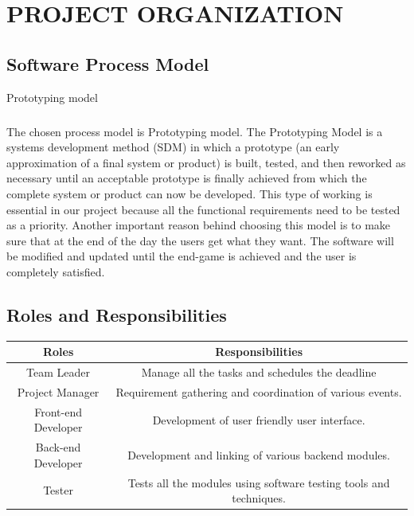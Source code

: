 \documentclass[12pt,a4paper,final,oneside]{report}
\begin{document}
\chapter{PROJECT ORGANIZATION}

\section{ Software Process Model}
{Prototyping model}

\paragraph{}The chosen process model is Prototyping model. The Prototyping Model is a systems development method (SDM) in which a prototype (an early approximation of a final system or product) is built, tested, and then reworked as necessary until an acceptable prototype is finally achieved from which the complete system or product can now be developed. This type of working is essential in our project because all the functional requirements need to be tested as a priority. Another important reason behind choosing this model is to make sure that at the end of the day the users get what they want. The software will be modified and updated until the end-game is achieved and the user is completely satisfied.

\section{ Roles and Responsibilities}
\begin{center}
    \begin{tabular}{ |c|c| }
    \hline
    Roles & Responsibilities \\ 
    \hline
    Team Leader& Manage all the tasks and schedules the deadline \\ 
     \hline
  Project Manager & Requirement gathering and coordination of various events.\\ 
    \hline
    Front-end Developer& Development of user friendly user interface.  \\ 
    \hline
   Back-end Developer& Development and linking of various backend modules.\\ 
   \hline
    Tester & Tests all the modules using software testing tools and techniques.\\
\hline
       
    \end{tabular}
\end{center}
\end{document}
